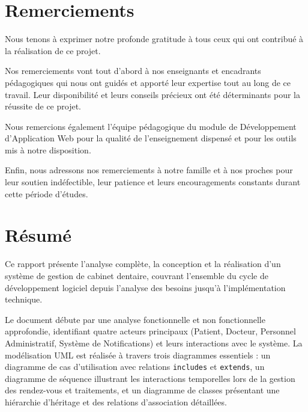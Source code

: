 \documentclass[12pt,a4paper]{report}
\begin{document}

\chapter*{Remerciements}
\thispagestyle{empty}
\vspace*{\fill}

Nous tenons à exprimer notre profonde gratitude à tous ceux qui ont contribué à la réalisation de ce projet.

Nos remerciements vont tout d'abord à nos enseignants et encadrants pédagogiques qui nous ont guidés et apporté leur expertise tout au long de ce travail. Leur disponibilité et leurs conseils précieux ont été déterminants pour la réussite de ce projet.

Nous remercions également l'équipe pédagogique du module de Développement d'Application Web pour la qualité de l'enseignement dispensé et pour les outils mis à notre disposition.

Enfin, nous adressons nos remerciements à notre famille et à nos proches pour leur soutien indéfectible, leur patience et leurs encouragements constants durant cette période d'études.

\vspace*{\fill}
\newpage

\chapter*{Résumé}
\thispagestyle{empty}

Ce rapport présente l'analyse complète, la conception et la réalisation d'un système de gestion de cabinet dentaire, couvrant l'ensemble du cycle de développement logiciel depuis l'analyse des besoins jusqu'à l'implémentation technique.

Le document débute par une analyse fonctionnelle et non fonctionnelle approfondie, identifiant quatre acteurs principaux (Patient, Docteur, Personnel Administratif, Système de Notifications) et leurs interactions avec le système. La modélisation UML est réalisée à travers trois diagrammes essentiels : un diagramme de cas d'utilisation avec relations \texttt{includes} et \texttt{extends}, un diagramme de séquence illustrant les interactions temporelles lors de la gestion des rendez-vous et traitements, et un diagramme de classes présentant une hiérarchie d'héritage et des relations d'association détaillées.
\end{document}
